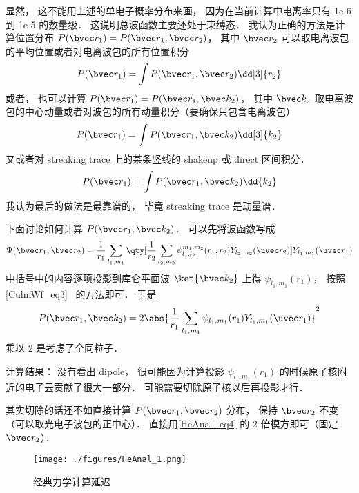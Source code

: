 显然， 这不能用上述的单电子概率分布来画， 因为在当前计算中电离率只有 1e-6 到 1e-5 的数量级． 这说明总波函数主要还处于束缚态． 我认为正确的方法是计算位置分布 $P(\bvec r_1) = P(\bvec r_1, \bvec r_2)$， 其中 $\bvec r_2$ 可以取电离波包的平均位置或者对电离波包的所有位置积分
\begin{equation}
P(\bvec r_1) = \int P(\bvec r_1, \bvec r_2) \dd[3]{r_2}
\end{equation}
或者， 也可以计算 $P(\bvec r_1) = P(\bvec r_1, \bvec k_2)$， 其中 $\bvec k_2$ 取电离波包的中心动量或者对波包的所有动量积分（要确保只包含电离波包）
\begin{equation}
P(\bvec r_1) = \int P(\bvec r_1, \bvec k_2) \dd[3]{k_2}
\end{equation}
又或者对 streaking trace 上的某条竖线的 shakeup 或 direct 区间积分．
\begin{equation}
P(\bvec r_1) = \int P(\bvec r_1, \bvec k_2) \dd{k_2}
\end{equation}
我认为最后的做法是最靠谱的， 毕竟 streaking trace 是动量谱．

下面讨论如何计算 $P(\bvec r_1, \bvec k_2)$． 可以先将波函数写成
\begin{equation}\label{HeAnal_eq4}
\Psi(\bvec r_1, \bvec r_2) = \frac{1}{r_1}\sum_{l_1,m_1} \qty[\frac{1}{r_2}\sum_{l_2,m_2} \psi_{l_1,l_2}^{m_1,m_2}(r_1, r_2) Y_{l_2,m_2}(\uvec r_2)] Y_{l_1,m_1}(\uvec r_1)
\end{equation}
中括号中的内容逐项投影到库仑平面波 $\ket{\bvec k_2}$ 上得 $\psi_{l_1,m_1}(r_1)$， 按照\autoref{CulmWf_eq3}~ 的方法即可． 于是
\begin{equation}\label{HeAnal_eq1}
P(\bvec r_1, \bvec k_2) = 2\abs{\frac{1}{r_1}\sum_{l_1,m_1} \psi_{l_1,m_1}(r_1) Y_{l_1,m_1}(\uvec r_1)}^2
\end{equation}
乘以 2 是考虑了全同粒子．

计算结果： 没有看出 dipole， 很可能因为计算投影 $\psi_{l_1,m_1}(r_1)$ 的时候原子核附近的电子云贡献了很大一部分． 可能需要切除原子核以后再投影才行．

其实切除的话还不如直接计算 $P(\bvec r_1, \bvec r_2)$ 分布， 保持 $\bvec r_2$ 不变（可以取光电子波包的正中心）． 直接用\autoref{HeAnal_eq4} 的 2 倍模方即可（固定 $\bvec r_2$）．

\begin{figure}[ht]
\centering
\texttt{[image: ./figures/HeAnal\_1.png]}
\caption{经典力学计算延迟} \label{HeAnal_fig1}
\end{figure}

